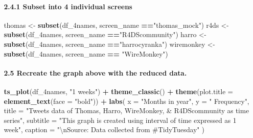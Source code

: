 \documentclass[]{article}
\newenvironment{Shaded}{\begin{snugshade}}{\end{snugshade}}
\newcommand{\CharTok}[1]{\textcolor[rgb]{0.31,0.60,0.02}{#1}}
\newcommand{\DataTypeTok}[1]{\textcolor[rgb]{0.13,0.29,0.53}{#1}}
\newcommand{\KeywordTok}[1]{\textcolor[rgb]{0.13,0.29,0.53}{\textbf{#1}}}
\newcommand{\NormalTok}[1]{#1}
\newcommand{\OperatorTok}[1]{\textcolor[rgb]{0.81,0.36,0.00}{\textbf{#1}}}
\newcommand{\StringTok}[1]{\textcolor[rgb]{0.31,0.60,0.02}{#1}}
\let\oldparagraph\paragraph
\renewcommand{\paragraph}[1]{\oldparagraph{#1}\mbox{}}
\begin{document}
\hypertarget{subset-into-4-individual-screens}{%
\paragraph{2.4.1 Subset into 4 individual
screens}\label{subset-into-4-individual-screens}}

\begin{Shaded}
\begin{Highlighting}[]
\NormalTok{thomas <-}\StringTok{ }\KeywordTok{subset}\NormalTok{(df_4names, screen_name }\OperatorTok{==}\StringTok{"thomas_mock"}\NormalTok{)}
\NormalTok{r4ds <-}\StringTok{ }\KeywordTok{subset}\NormalTok{(df_4names, screen_name }\OperatorTok{==}\StringTok{"R4DScommunity"}\NormalTok{)}
\NormalTok{harro <-}\StringTok{ }\KeywordTok{subset}\NormalTok{(df_4names, screen_name }\OperatorTok{==}\StringTok{"harrocyranka"}\NormalTok{)}
\NormalTok{wiremonkey <-}\StringTok{ }\KeywordTok{subset}\NormalTok{(df_4names, screen_name }\OperatorTok{==}\StringTok{ "WireMonkey"}\NormalTok{)}
\end{Highlighting}
\end{Shaded}

\hypertarget{recreate-the-graph-above-with-the-reduced-data.}{%
\paragraph{2.5 Recreate the graph above with the reduced
data.}\label{recreate-the-graph-above-with-the-reduced-data.}}

\begin{Shaded}
\begin{Highlighting}[]
\KeywordTok{ts_plot}\NormalTok{(df_4names, }\StringTok{"1 weeks"}\NormalTok{) }\OperatorTok{+}\StringTok{ }\KeywordTok{theme_classic}\NormalTok{() }\OperatorTok{+}\StringTok{ }\KeywordTok{theme}\NormalTok{(}\DataTypeTok{plot.title =} \KeywordTok{element_text}\NormalTok{(}\DataTypeTok{face =} \StringTok{"bold"}\NormalTok{)) }\OperatorTok{+}\StringTok{ }\KeywordTok{labs}\NormalTok{(}
    \DataTypeTok{x =} \StringTok{"Months in year"}\NormalTok{, }\DataTypeTok{y =} \StringTok{" Frequency"}\NormalTok{,}
    \DataTypeTok{title =} \StringTok{"Tweets data of Thomas, Harro, WireMonkey, & R4DScommunity as time series"}\NormalTok{,}
    \DataTypeTok{subtitle =} \StringTok{"This graph is created using interval of time expressed as 1 week"}\NormalTok{,}
    \DataTypeTok{caption =} \StringTok{"}\CharTok{\textbackslash{}n}\StringTok{Source: Data collected from #TidyTuesday"}
\NormalTok{  )}
\end{Highlighting}
\end{Shaded}
\end{document}
